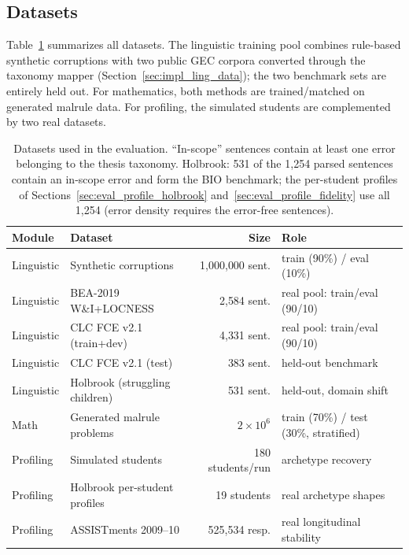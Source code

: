 \subsection{Datasets}
\label{sec:eval_setup_data}

Table~\ref{tab:eval_datasets} summarizes all datasets. The linguistic training pool combines rule-based synthetic corruptions with two public GEC corpora converted through the taxonomy mapper (Section~\ref{sec:impl_ling_data}); the two benchmark sets are entirely held out. For mathematics, both methods are trained/matched on generated malrule data. For profiling, the simulated students are complemented by two real datasets.

\begin{table}[h]
\centering
\caption[Datasets used in the evaluation.]{Datasets used in the evaluation. ``In-scope'' sentences contain at least one error belonging to the thesis taxonomy. Holbrook: 531 of the 1{,}254 parsed sentences contain an in-scope error and form the BIO benchmark; the per-student profiles of Sections~\ref{sec:eval_profile_holbrook} and~\ref{sec:eval_profile_fidelity} use all 1{,}254 (error density requires the error-free sentences).}
\label{tab:eval_datasets}
\small\setlength{\tabcolsep}{4pt}
\begin{tabular}{@{}llr>{\raggedright\arraybackslash}p{}@{}}
\toprule
\textbf{Module} & \textbf{Dataset} & \textbf{Size} & \textbf{Role} \\
\midrule
Linguistic & Synthetic corruptions & 1{,}000{,}000 sent. & train (90\%) / eval (10\%) \\
Linguistic & BEA-2019 W\&I+LOCNESS & 2{,}584 sent. & real pool: train/eval (90/10) \\
Linguistic & CLC FCE v2.1 (train+dev) & 4{,}331 sent. & real pool: train/eval (90/10) \\
Linguistic & CLC FCE v2.1 (test) & 383 sent. & held-out benchmark \\
Linguistic & Holbrook (struggling children) & 531 sent. & held-out, domain shift \\
Math & Generated malrule problems & $2\times10^6$ & train (70\%) / test (30\%, stratified) \\
Profiling & Simulated students & 180 students/run & archetype recovery \\
Profiling & Holbrook per-student profiles & 19 students & real archetype shapes \\
Profiling & ASSISTments 2009--10 & 525{,}534 resp. & real longitudinal stability \\
\bottomrule
\end{tabular}
\end{table}

